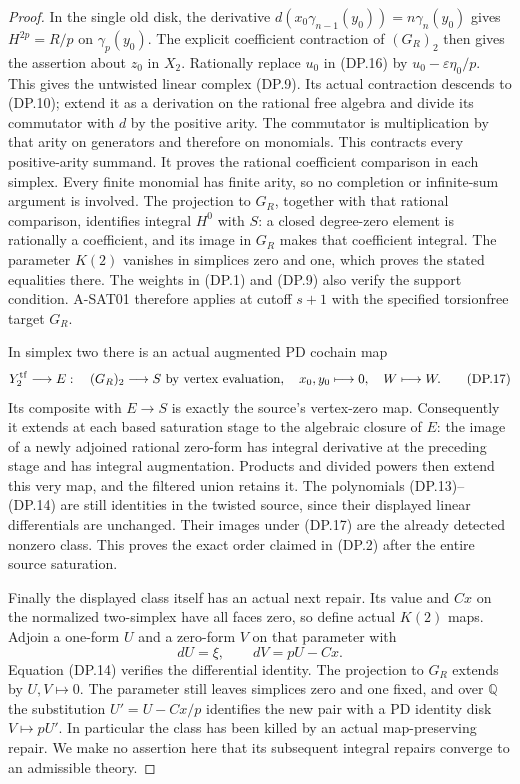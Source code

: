 \begin{proof}
In the single old disk, the derivative
$d(x_0\gamma_{n-1}(y_0))=n\gamma_n(y_0)$ gives
$H^{2p}=R/p$ on $\gamma_p(y_0)$.
The explicit coefficient contraction of $(G_R)_2$
then gives the assertion about $z_0$ in $X_2$.
Rationally replace $u_0$ in (DP.16) by
$u_0-\varepsilon\eta_0/p$. This gives the untwisted
linear complex (DP.9). Its actual contraction descends
to (DP.10); extend it as a derivation on the rational
free algebra and divide its commutator with $d$ by
the positive arity. The commutator is multiplication
by that arity on generators and therefore on monomials.
This contracts every positive-arity summand.
It proves the rational coefficient comparison in each
simplex. Every finite monomial has finite arity, so
no completion or infinite-sum argument is involved.
The projection to $G_R$, together with that rational
comparison, identifies integral $H^0$ with $S$:
a closed degree-zero element is rationally a coefficient,
and its image in $G_R$ makes that coefficient integral.
The parameter $K(2)$ vanishes in simplices zero and one,
which proves the stated equalities there. The weights
in (DP.1) and (DP.9) also verify the support condition.
A-SAT01 therefore applies at cutoff $s+1$ with the
specified torsionfree target $G_R$.

In simplex two there is an actual augmented PD cochain map
\[
 Y_2^{\rm tf}\longrightarrow E:
 \quad (G_R)_2\longrightarrow S\text{ by vertex evaluation},
 \quad x_0,y_0\longmapsto0,
 \quad W\longmapsto W.                             \tag{DP.17}
\]
Its composite with $E\to S$ is exactly the source's
vertex-zero map. Consequently it extends at each based
saturation stage to the algebraic closure of $E$:
the image of a newly adjoined rational zero-form has
integral derivative at the preceding stage and has
integral augmentation. Products and divided powers
then extend this very map, and the filtered union
retains it. The polynomials (DP.13)--(DP.14) are still
identities in the twisted source, since their displayed
linear differentials are unchanged.
Their images under (DP.17) are the already detected
nonzero class. This proves the exact order claimed
in (DP.2) after the entire source saturation.

Finally the displayed class itself has an actual next
repair. Its value and $Cx$ on the normalized two-simplex
have all faces zero, so define actual $K(2)$ maps.
Adjoin a one-form $U$ and a zero-form $V$ on that
parameter with
\[
                      dU=\xi,\qquad dV=pU-Cx.
 \tag{DP.18}
\]
Equation (DP.14) verifies the differential identity.
The projection to $G_R$ extends by $U,V\mapsto0$.
The parameter still leaves simplices zero and one fixed,
and over $\mathbb Q$ the substitution $U'=U-Cx/p$
identifies the new pair with a PD identity disk
$V\mapsto pU'$. In particular the class has been killed
by an actual map-preserving repair. We make no assertion
here that its subsequent integral repairs converge to
an admissible theory.
\end{proof}

